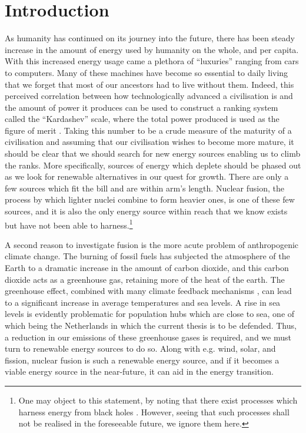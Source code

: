 \chapter{Introduction}
\label{chap: intro}
\setcounter{page}{1}


As humanity has continued on its journey into the future, there has been steady increase in the amount of energy used by humanity on the whole, and per capita. With this increased energy usage came a plethora of ``luxuries'' ranging from cars to computers. Many of these machines have become so essential to daily living that we forget that most of our ancestors had to live without them. Indeed, this perceived correlation between how technologically advanced a civilisation is and the amount of power it produces can be used to construct a ranking system called the ``Kardashev'' scale, where the total power produced is used as the figure of merit \cite{gray2020extended}. Taking this number to be a crude measure of the maturity of a civilisation and assuming that our civilisation wishes to become more mature, it should be clear that we should search for new energy sources enabling us to climb the ranks. More specifically, sources of energy which deplete should be phased out as we look for renewable alternatives in our quest for growth. There are only a few sources which fit the bill and are within arm's length. Nuclear fusion, the process by which lighter nuclei combine to form heavier ones, is one of these few sources, and it is also the only energy source within reach that we know exists but have not been able to harness.\footnote{One may object to this statement, by noting that there exist processes which harness energy from black holes \cite{opatrny2012black,tursunov2019fifty,comisso2021magnetic}. However, seeing that such processes shall not be realised in the foreseeable future, we ignore them here.} \par 

A second reason to investigate fusion is the more acute problem of anthropogenic climate change. The burning of fossil fuels has subjected the atmosphere of the Earth to a dramatic increase in the amount of carbon dioxide, and this carbon dioxide acts as a greenhouse gas, retaining more of the heat of the earth. The greenhouse effect, combined with many climate feedback mechanisms \cite{schneider1972cloudiness,hansen1984climate,curry1995sea,dean2018methane}, can lead to a significant increase in average temperatures and sea levels. A rise in sea levels is evidently problematic for population hubs which are close to sea, one of which being the Netherlands in which the current thesis is to be defended. Thus, a reduction in our emissions of these greenhouse gases is required, and we must turn to renewable energy sources to do so. Along with e.g. wind, solar, and fission, nuclear fusion is such a renewable energy source, and if it becomes a viable energy source in the near-future, it can aid in the energy transition. \par 


